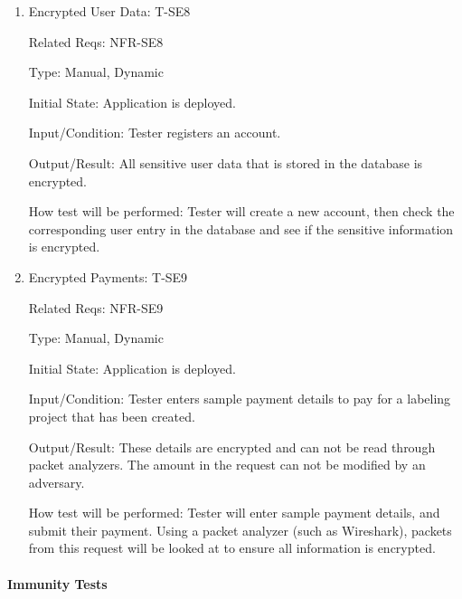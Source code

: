 \documentclass[12pt, titlepage]{article}
\begin{document}
\begin{enumerate}

\item{Encrypted User Data: T-SE8\\}

Related Reqs: NFR-SE8

Type: Manual, Dynamic
					
Initial State: Application is deployed.
					
Input/Condition: Tester registers an account.
					
Output/Result: All sensitive user data that is stored in the database is encrypted.
					
How test will be performed: Tester will create a new account, then check the corresponding user entry in the database and see if the sensitive information is encrypted.

\item{Encrypted Payments: T-SE9\\}

Related Reqs: NFR-SE9

Type: Manual, Dynamic
					
Initial State: Application is deployed.
					
Input/Condition: Tester enters sample payment details to pay for a labeling project that has been created.
					
Output/Result: These details are encrypted and can not be read through packet analyzers. The amount in the request can not be modified by an adversary.
					
How test will be performed: Tester will enter sample payment details, and submit their payment. Using a packet analyzer (such as Wireshark), packets from this request will be looked at to ensure all information is encrypted.

\end{enumerate}

\paragraph{Immunity Tests}
\end{document}
